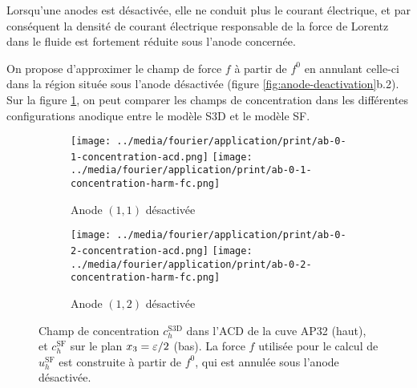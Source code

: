 Lorsqu'une anodes est désactivée, elle ne conduit plus le courant
électrique, et par conséquent la densité de courant électrique
responsable de la force de Lorentz dans le fluide est fortement
réduite sous l'anode concernée.

On propose d'approximer le champ de force $f$ à partir de $f^0$ en
annulant celle-ci dans la région située sous l'anode désactivée
(figure \ref{fig:anode-deactivation}b.2). Sur la figure
\ref{fig:harmonic-concentration-comp-fc}, on peut comparer les champs
de concentration dans les différentes configurations anodique entre le
modèle S3D et le modèle SF.


\begin{figure}[h]
  \begin{center}
    \begin{subfigure}[t]{\textwidth}
      \texttt{[image: ../media/fourier/application/print/ab-0-1-concentration-acd.png]}
      \texttt{[image: ../media/fourier/application/print/ab-0-1-concentration-harm-fc.png]}
      \caption{Anode $(1,1)$ désactivée}
    \end{subfigure}

    \begin{subfigure}[t]{\textwidth}
      \texttt{[image: ../media/fourier/application/print/ab-0-2-concentration-acd.png]}
      \texttt{[image: ../media/fourier/application/print/ab-0-2-concentration-harm-fc.png]}
      \caption{Anode $(1,2)$ désactivée}
    \end{subfigure}


    \caption{Champ de concentration $c_h^\mathrm{S3D}$ dans l'ACD de
      la cuve AP32 (haut), et $c_h^\mathrm{SF}$ sur le plan
      $x_3 = \varepsilon / 2$ (bas). La force $f$ utilisée
      pour le calcul de $u_h^\mathrm{SF}$  est construite à
      partir de $f^0$, qui est annulée sous l'anode désactivée.}

    \label{fig:harmonic-concentration-comp-fc}
  \end{center}
\end{figure}

